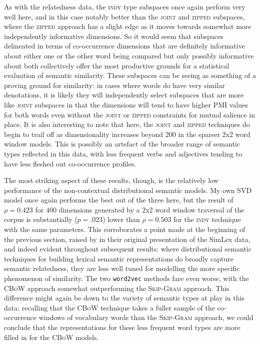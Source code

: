 As with the relatedness data, the \textsc{indy} type subspaces once again perform very well here, and in this case notably better than the \textsc{joint} and \textsc{zipped} subspaces, where the \textsc{zipped} approach has a slight edge as it moves towards somewhat more independently informative dimensions.  So it would seem that subspaces delineated in terms of co-occurrence dimensions that are definitely informative about either one or the other word being compared but only possibly informative about both collectively offer the most productive grounds for a statistical evaluation of semantic similarity.  These subspaces can be seeing as something of a proving ground for similarity: in cases where words do have very similar denotations, it is likely they will independently select subspaces that are more like \textsc{joint} subspaces in that the dimensions will tend to have higher PMI values for both words even without the \textsc{joint} or \textsc{zipped} constraints for mutual salience in place.  It is also interesting to note that here, the \textsc{joint} and \textsc{zipped} techniques do begin to trail off as dimensionality increases beyond 200 in the sparser 2x2 word window models.  This is possibly an artefact of the broader range of semantic types reflected in this data, with less frequent verbs and adjectives tending to have less fleshed out co-occurrence profiles.

The most striking aspect of these results, though, is the relatively low performance of the non-contextual distributional semantic models.  My own SVD model once again performs the best out of the three here, but the result of $\rho = 0.423$ for 400 dimensions generated by a 2x2 word window traversal of the corpus is substantially ($p = .023$) lower than $\rho = 0.503$ for the \textsc{indy} technique with the same parameters.  This corroborates a point made at the beginning of the previous section, raised by \cite{HillEA2015} in their original presentation of the SimLex data, and indeed evident throughout subsequent results: where distributional semantic techniques for building lexical semantic representations do broadly capture semantic relatedness, they are less well tuned for modelling the more specific phenomenon of similarity.  The two \texttt{word2vec} methods fare even worse, with the \textsc{CBoW} approach somewhat outperforming the \textsc{Skip-Gram} approach.  This difference might again be down to the variety of semantic types at play in this data: recalling that the \textsc{CBoW} technique takes a fuller sample of the co-occurrence windows of vocabulary words than the \textsc{Skip-Gram} approach, we could conclude that the representations for these less frequent word types are more filled in for the \textsc{CBoW} models.

